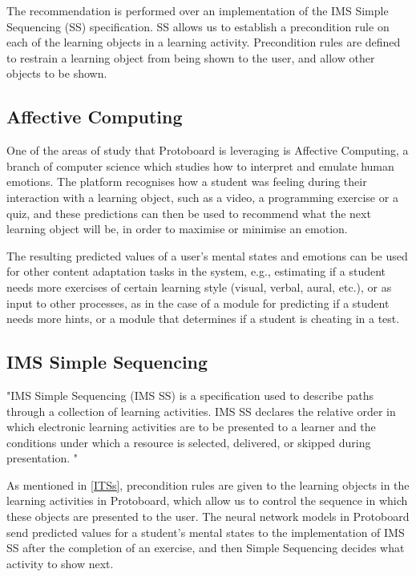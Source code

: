 \documentclass{acm_proc_article-sp}
\begin{document}
The recommendation is performed over an implementation of the IMS Simple
Sequencing (SS) specification. SS allows us to establish a precondition
rule on each of the learning objects in a learning
activity. Precondition rules are defined to restrain a learning object
from being shown to the user, and allow other objects to be shown.


\subsection{Affective Computing}
One of the areas of study that Protoboard is leveraging is Affective
Computing, a branch of computer science which studies how to interpret
and emulate human emotions. The platform recognises how a student was
feeling during their interaction with a learning object, such as a
video, a programming exercise or a quiz, and these predictions can
then be used to recommend what the next learning object will be, in
order to maximise or minimise an emotion.

The resulting predicted values of a user's mental states and emotions
can be used for other content adaptation tasks in the system, e.g.,
estimating if a student needs more exercises of certain learning style
(visual, verbal, aural, etc.), or as input to other processes, as in
the case of a module for predicting if a student needs more hints, or
a module that determines if a student is cheating in a test.


\subsection{IMS Simple Sequencing}

"IMS Simple Sequencing (IMS SS) is a specification used to describe
paths through a collection of learning activities. IMS SS declares
the relative order in which electronic learning activities are to be
presented to a learner and the conditions under which a resource is
selected, delivered, or skipped during
presentation. \cite{bailey2007ims}"

As mentioned in \ref{ITSs}, precondition rules are given to the
learning objects in the learning activities in Protoboard, which allow
us to control the sequence in which these objects are presented to the
user. The neural network models in Protoboard send predicted values
for a student's mental states to the implementation of IMS SS after the
completion of an exercise, and then Simple Sequencing decides what
activity to show next.
\end{document}
